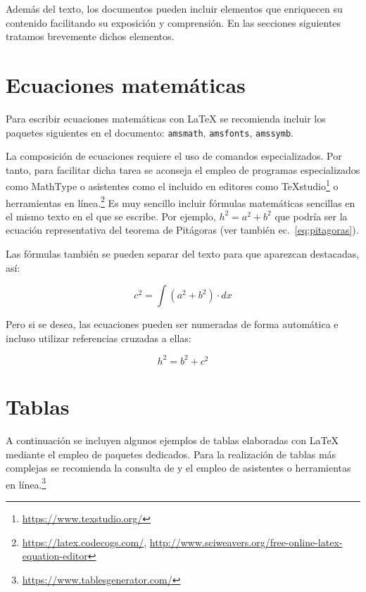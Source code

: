 Además del texto, los documentos pueden incluir elementos que enriquecen su contenido facilitando su exposición y comprensión. En las secciones siguientes tratamos brevemente dichos elementos.

\section{Ecuaciones matemáticas}
Para escribir ecuaciones matemáticas con \LaTeX{} se recomienda incluir los paquetes siguientes en el documento: \texttt{amsmath}, \texttt{amsfonts}, \texttt{amssymb}. 

La composición de ecuaciones requiere el uso de comandos especializados. Por tanto, para facilitar dicha tarea se aconseja el empleo de programas especializados como \textsf{MathType} o asistentes como el incluido en editores como \TeX studio\footnote{\url{https://www.texstudio.org/}} o herramientas en línea.\footnote{\url{https://latex.codecogs.com/},  \url{http://www.sciweavers.org/free-online-latex-equation-editor}} Es muy sencillo incluir fórmulas matemáticas sencillas en el mismo texto en el que se escribe. Por ejemplo, $h^{2}=a^{2}+b^{2}$ que podría ser la ecuación representativa del teorema de Pitágoras (ver también ec.~\ref{eq:pitagoras}).

Las fórmulas también se pueden separar del texto para que aparezcan destacadas, así:

\[
c^2  = \int {\left( {a^2  + b^2} \right)}  \cdot dx
\]

Pero si se desea, las ecuaciones pueden ser numeradas de forma automática e incluso utilizar referencias cruzadas a ellas:

\begin{equation} \label{eq:pitagoras}
	h^{2}=b^{2} + c^{2}
\end{equation}





\section{Tablas}
\label{sec:tablas}
A continuación se incluyen algunos ejemplos de tablas elaboradas con 
\LaTeX{} mediante el empleo de paquetes dedicados. Para la realización de tablas más complejas se recomienda la consulta de \cite{borbon21} y el empleo de asistentes o herramientas en línea.\footnote{\url{https://www.tablesgenerator.com/}}

